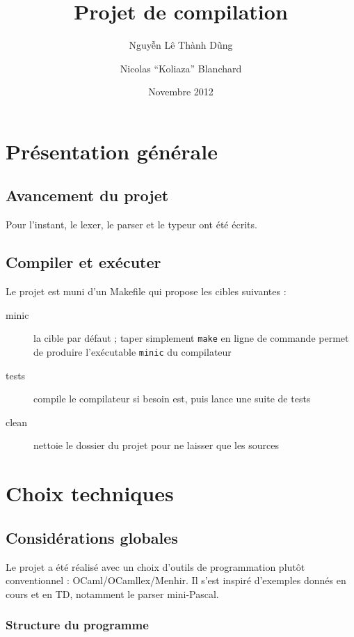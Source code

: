 \documentclass[a4paper, 11pt]{article}
\begin{document}
 
\title{Projet de compilation}
\author{Nguy\~{\^e}n Lê Thành D\~ung \and Nicolas ``Koliaza'' Blanchard}
\date{Novembre 2012}
\maketitle

\section{Présentation générale}

\subsection{Avancement du projet}

Pour l'instant, le lexer, le parser et le typeur ont été écrits.

\subsection{Compiler et exécuter}

Le projet est muni d'un Makefile qui propose les cibles suivantes :
\begin{description}
\item[minic] la cible par défaut ; taper simplement \texttt{make} en ligne
  de commande permet de produire l'exécutable \texttt{minic} du compilateur
\item[tests] compile le compilateur si besoin est, puis lance une suite de tests
\item[clean] nettoie le dossier du projet pour ne laisser que les sources
\end{description}


\section{Choix techniques}

\subsection{Considérations globales}

Le projet a été réalisé avec un choix d'outils de programmation plutôt conventionnel :
OCaml/OCamllex/Menhir. Il s'est inspiré d'exemples donnés en cours et en TD, notamment
le parser mini-Pascal.

\subsubsection{Structure du programme}
\end{document}
